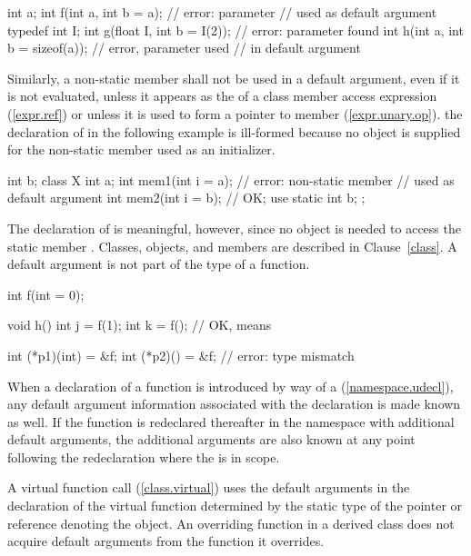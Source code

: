 \begin{codeblock}
int a;
int f(int a, int b = a);            // error: parameter 
                                    // used as default argument
typedef int I;
int g(float I, int b = I(2));       // error: parameter  found
int h(int a, int b = sizeof(a));    // error, parameter  used
                                    // in default argument
\end{codeblock}
\exitexample
Similarly, a non-static member shall not be used in a default argument, even if it is not evaluated, unless it appears as
the  of a class member access expression (\ref{expr.ref}) or
unless it is used to form a pointer to member (\ref{expr.unary.op}).
\enterexample
the declaration of
in the following example is ill-formed because no object is supplied for the
non-static member
used as an initializer.

\begin{codeblock}
int b;
class X {
  int a;
  int mem1(int i = a);          // error: non-static member 
                                // used as default argument
  int mem2(int i = b);          // OK;  use 
  static int b;
};
\end{codeblock}

The declaration of
is meaningful, however, since no object is needed to access the static member
.
Classes, objects, and members are described in Clause~\ref{class}.
\exitexample
A default argument is not part of the
type of a function.
\enterexample

\begin{codeblock}
int f(int = 0);

void h() {
  int j = f(1);
  int k = f();                  // OK, means 
}

int (*p1)(int) = &f;
int (*p2)() = &f;               // error: type mismatch
\end{codeblock}
\exitexample
When a declaration of a function is introduced by way of a
(\ref{namespace.udecl}), any default argument information associated
with the declaration is made known as well.
If the function is redeclared
thereafter in the namespace with additional default arguments,
the additional arguments are also known at any point following
the redeclaration where the
is in scope.

\pnum
{}%
A virtual function call (\ref{class.virtual}) uses the default
arguments in the declaration of the virtual function determined
by the static type of the pointer or reference denoting the
object.
An overriding function in a derived class does not
acquire default arguments from the function it overrides.
\enterexample

